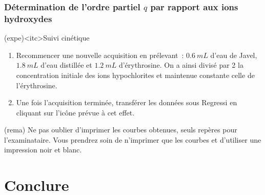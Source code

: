 \documentclass[../main/main.tex]{subfiles}
\begin{document}

\subsubsection{Détermination de l'ordre partiel $q$ par rapport aux ions hydroxydes}

\begin{tcb}[breakable](expe)<itc>{Suivi cinétique}
	\begin{enumerate}
		\item Recommencer une nouvelle acquisition en prélevant~: $\SI{0,6}{mL}$ d'eau
		      de Javel, $\SI{1.8}{mL}$ d'eau distillée et $\SI{1,2}{mL}$ d'érythrosine. On
		      a ainsi divisé par 2 la concentration initiale des ions hypochlorites et
		      maintenue constante celle de l'érythrosine.
		\item Une fois l'acquisition terminée, transférer les données sous Regressi en
		      cliquant sur l'icône prévue à cet effet.
	\end{enumerate}
\end{tcb}



\begin{tcb}(rema){}
	Ne pas oublier d'imprimer les courbes obtenues, seuls repères pour
	l'examinataire. Vous prendrez soin de n'imprimer que les courbes et d'utiliser
	une impression noir et blanc.
\end{tcb}

\section{Conclure}


\end{document}
